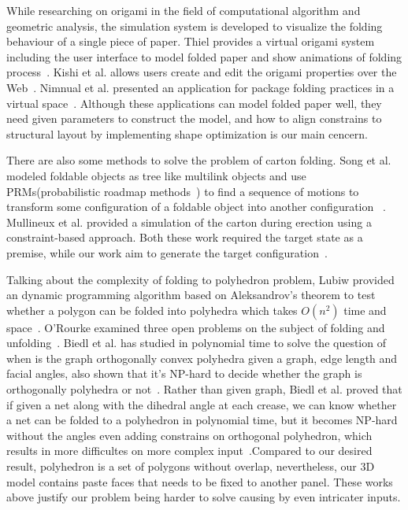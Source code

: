 \documentclass[submission]{gmp2018}
\begin{document}
While researching on origami in the field of computational algorithm and geometric analysis, the simulation system is developed to visualize the folding behaviour of a single piece of paper. Thiel provides a virtual origami system including the user interface to model folded paper and show animations of folding process~\cite{Thiel1998}. Kishi et al. allows users create and edit the origami properties over the Web~\cite{Kishi:1998:OFP:786112.786279}. Nimnual et al. presented an application for package folding practices in a virtual space~\cite{Nimnual2007Virtual}. Although these applications can model folded paper well, they need given parameters to construct the model, and how to align constrains to structural layout by implementing shape optimization is our main cencern.

There are also some methods to solve the problem of carton folding. Song et al. modeled foldable objects as tree like multilink objects and use PRMs(probabilistic roadmap methods~\cite{Kavraki:1994:PRP:891758}) to find a sequence of motions to transform some configuration of a foldable object into another configuration~ \cite{Song:2000:MPA:892954}. Mullineux et al. provided a simulation of the carton during erection using a constraint-based approach. Both these work required the target state as a premise, while our work aim to generate the target configuration~\cite{Mullineux:2010:CSC:1739328.1739673}.

Talking about the complexity of folding to polyhedron problem, Lubiw provided an dynamic programming algorithm based on Aleksandrov's theorem to test whether a polygon can be folded into polyhedra which takes $O(n^2)$ time and space~\cite{Lubiw1996When}. O'Rourke examined three open problems on the subject of folding and unfolding~\cite{O'Rourke:1998:FUC:646319.686376}. Biedl et al. has studied in polynomial time to solve the question of when is the graph orthogonally convex polyhedra given a graph, edge length and facial angles, also shown that it's NP-hard to decide whether the graph is orthogonally polyhedra or not~\cite{Biedl2004When}. Rather than given graph, Biedl et al.  proved that if given a net along with the dihedral angle at each crease, we can know whether a net can be folded to a polyhedron in polynomial time, but it becomes NP-hard without the angles even adding constrains on orthogonal polyhedron, which results in more difficultes on more complex input~\cite{Biedl:2005:NFP:1090462.1646553}.Compared to our desired result, polyhedron is a set of polygons without overlap, nevertheless, our 3D model contains paste faces that needs to be fixed to another panel. These works above justify our problem being harder to solve causing by even intricater inputs.
\end{document}
